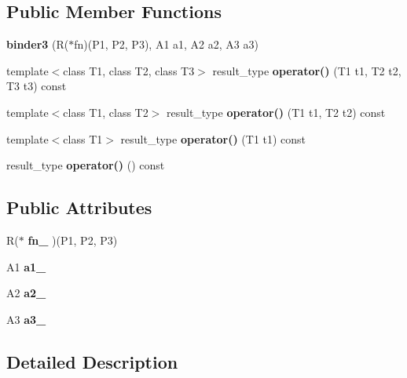 \subsection*{Public Member Functions}
\begin{CompactItemize}
\item 
\textbf{binder3} (R($\ast$fn)(P1, P2, P3), A1 a1, A2 a2, A3 a3)\label{structam_1_1lambda_1_1binder3_0fc64e182ce14a2e0226c4aed7669595}

\item 
template$<$class T1, class T2, class T3$>$ result\_\-type \textbf{operator()} (T1 t1, T2 t2, T3 t3) const \label{structam_1_1lambda_1_1binder3_6e385adbc8d03bb743d036cc66ab5274}

\item 
template$<$class T1, class T2$>$ result\_\-type \textbf{operator()} (T1 t1, T2 t2) const\label{structam_1_1lambda_1_1binder3_2820f406391aee3c5dcaa3698745d2d9}

\item 
template$<$class T1$>$ result\_\-type \textbf{operator()} (T1 t1) const \label{structam_1_1lambda_1_1binder3_88038d1817a18b61ead1ec513ee6e291}

\item 
result\_\-type \textbf{operator()} () const\label{structam_1_1lambda_1_1binder3_6281d09b9414009f2428e22f6b282cb7}

\end{CompactItemize}
\subsection*{Public Attributes}
\begin{CompactItemize}
\item 
R($\ast$ \textbf{fn\_\-} )(P1, P2, P3)\label{structam_1_1lambda_1_1binder3_11ea57f8e411cf238142c8893d59d9c6}

\item 
A1 \textbf{a1\_\-}\label{structam_1_1lambda_1_1binder3_2e578b8d898e9221094c6ef64362aa98}

\item 
A2 \textbf{a2\_\-}\label{structam_1_1lambda_1_1binder3_fcf561d9b972eb387ad91b0c6c605e71}

\item 
A3 \textbf{a3\_\-}\label{structam_1_1lambda_1_1binder3_94d9591a62e2343b0889c57ada1511e0}

\end{CompactItemize}


\subsection{Detailed Description}
